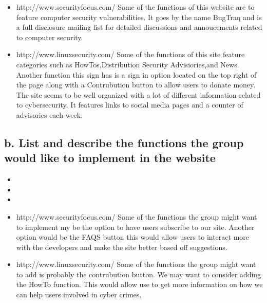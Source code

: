 \documentclass{article}
\begin{document}
\begin{itemize}
    \item %
    http://www.securityfocus.com/ 
    Some of the functions of this website are to feature computer security vulnerabilities. It goes by the name BugTraq and is a full disclosure mailing list
    for detailed discussions and annoucements related to computer security.
    \item %
    http://www.linuxsecurity.com/
    Some of the functions of this site feature categories such as HowTos,Distribution Security Advisiories,and News.
         Another function this sign has is a sign in option located on the top right of the page along with a Contrubution button to allow users to donate money.
         The site seems to be well organized with a lot of different information related to cybersecurity. 
         It features links to social media pages and a counter of advisories each week.
\end{itemize}



\subsection{b. List and describe the functions the group would like to implement in the website}

\begin{itemize}
    \item %
    
    \item %
    
    \item %
    
    \item %

          http://www.securityfocus.com/ Some of the functions the group might want to implement my be the option to have users subscribe to our site.
    Another option would be the FAQS button this would allow users to interact more with the developers and make the site better based off suggestions. 
    
    \item  %

         http://www.linuxsecurity.com/ Some of the functions the group might want to add is probably the contrubution button. We may want
         to consider adding the HowTo function. This would allow use to get more information on how we can help users involved in cyber crimes.



    
\end{itemize}
\end{document}
